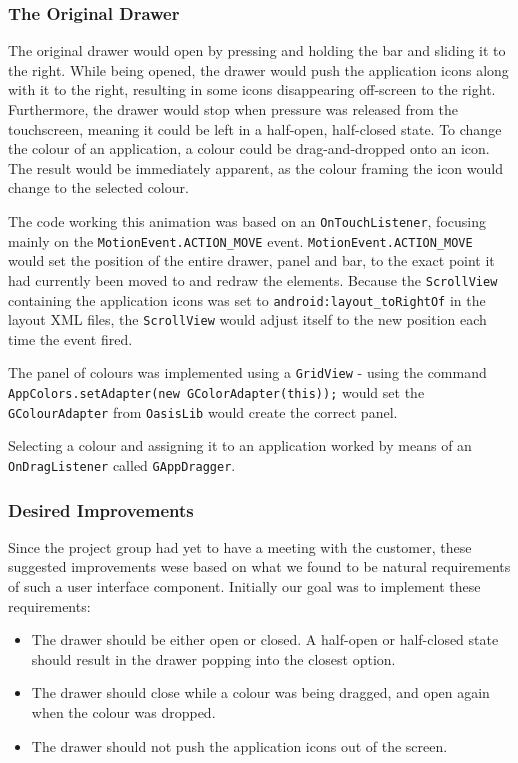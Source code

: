 \subsubsection{The Original Drawer}

The original drawer would open by pressing and holding the bar and sliding it to the right.
While being opened, the drawer would push the application icons along with it to the right, resulting in some icons disappearing off-screen to the right.
Furthermore, the drawer would stop when pressure was released from the touchscreen, meaning it could be left in a half-open, half-closed state.
To change the colour of an application, a colour could be drag-and-dropped onto an icon. The result would be immediately apparent, as the colour framing the icon would change to the selected colour.

The code working this animation was based on an \lstinline{OnTouchListener}, focusing mainly on the \lstinline{MotionEvent.ACTION_MOVE} event.
\lstinline{MotionEvent.ACTION_MOVE} would set the position of the entire drawer, panel and bar, to the exact point it had currently been moved to and redraw the elements.
Because the \lstinline{ScrollView} containing the application icons was set to \lstinline{android:layout_toRightOf} in the layout XML files, the \lstinline{ScrollView} would adjust itself to the new position each time the event fired.

The panel of colours was implemented using a \lstinline{GridView} - using the command \lstinline{AppColors.setAdapter(new GColorAdapter(this));} would set the \lstinline{GColourAdapter} from \lstinline{OasisLib} would create the correct panel.

Selecting a colour and assigning it to an application worked by means of an \lstinline{OnDragListener} called \lstinline{GAppDragger}.

\subsubsection{Desired Improvements}

Since the project group had yet to have a meeting with the customer, these suggested improvements wese based on what we found to be natural requirements of such a user interface component. Initially our goal was to implement these requirements:

\begin{itemize}
\item The drawer should be either open or closed. A half-open or half-closed state should result in the drawer popping into the closest option.
\item The drawer should close while a colour was being dragged, and open again when the colour was dropped.
\item The drawer should not push the application icons out of the screen.
\end{itemize}

